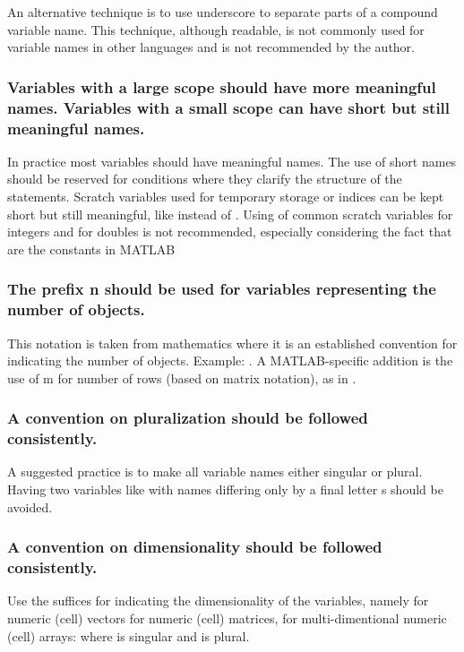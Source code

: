 \documentclass[titlepage,a4paper,12pt]{article}
\begin{document}
 An alternative technique is to use underscore to
separate parts of a compound variable name. This technique, although
readable, is not commonly used for variable names in other languages
and is not recommended by the author.

\subsubsection{Variables with a
large scope should have more meaningful names. Variables with a
small scope can have short but still meaningful names.}
 In practice most variables should have
meaningful names. The use of short names should be reserved for
conditions where they clarify the structure of the statements.
Scratch variables used for temporary storage or indices can be kept
short but still meaningful, like  instead of
. Using of common scratch
variables  for integers and  for
doubles is not recommended, especially considering the fact that
 are the constants in MATLAB

\subsubsection{The prefix n should be used for variables representing
the number of objects.}
 This notation is taken from mathematics where it is an
established convention for indicating the number of objects.
Example: . A
MATLAB-specific addition is the use of m for number of rows (based
on matrix notation), as in .

\subsubsection{A convention on pluralization should be followed
consistently.}
A suggested practice is to make all variable names either singular or plural. Having two variables like  with names differing only by a final letter s should be avoided.
\subsubsection{A convention on dimensionality should be followed
consistently.}
Use the suffices for indicating the dimensionality of the variables, namely
 for numeric (cell) vectors
 for numeric (cell) matrices,  for multi-dimentional numeric (cell) arrays:  where  is singular and
 is plural.
\end{document}
